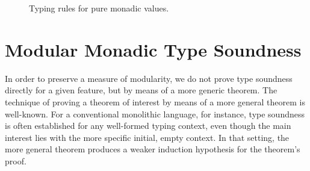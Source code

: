 \HaskellReset

\makeatother
\EndFmtInput



























\begin{figure}[t!]
\caption{Typing rules for pure monadic values.}
\label{fig:WFM+Pure}
\vspace{-.4cm}
\end{figure}

\section{Modular Monadic Type Soundness}


In order to preserve a measure of modularity, we do not prove type
soundness directly for a given feature, but by means of a more generic
theorem. The technique of proving a theorem of interest by means of a
more general theorem is well-known. For a conventional monolithic
language, for instance, type soundness is often established for any
well-formed typing context, even though the main interest lies with
the more specific initial, empty context. In that setting, the more
general theorem produces a weaker induction hypothesis for the
theorem's proof.

